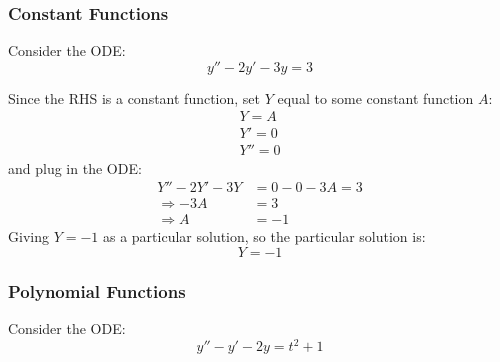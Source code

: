 \documentclass[12pt]{article}
\begin{document}
\subsubsection{Constant Functions}
\label{sssec:constantFunctions}
Consider the ODE:
\begin{equation*}
  y'' - 2y' - 3y = 3
\end{equation*}

Since the RHS is a constant function, set $Y$ equal to some constant function $A$:
\begin{align*}
  Y = A   \\
  Y' = 0  \\
  Y'' = 0
\end{align*}
and plug in the ODE:
\begin{align*}
  Y'' - 2Y' - 3Y  &= 0 - 0 - 3A = 3 \\
  \Rightarrow -3A &= 3 \\
  \Rightarrow A   &= -1
\end{align*}
Giving $Y=-1$ as a particular solution, so the particular solution is:
\begin{equation*}
  Y = -1
\end{equation*}
\subsubsection{Polynomial Functions}
\label{sssec:polynomialFunctions}
Consider the ODE:
\begin{equation*}
  y'' - y' - 2y = t^2 + 1
\end{equation*}

\end{document}
